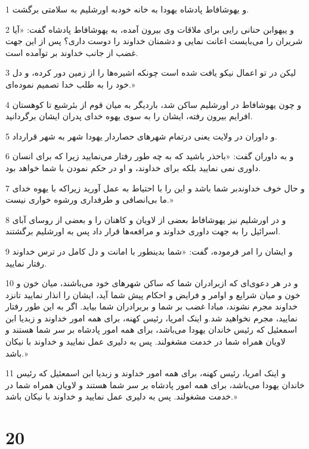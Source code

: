 \par 1 و یهوشافاط پادشاه یهودا به خانه خودبه اورشلیم به سلامتی برگشت.
\par 2 و ییهوابن حنانی رایی برای ملاقات وی بیرون آمده، به یهوشافاط پادشاه گفت: «آیا شریران را می‌بایست اعانت نمایی و دشمنان خداوند را دوست داری؟ پس از این جهت غضب از جانب خداوند بر توآمده است.
\par 3 لیکن در تو اعمال نیکو یافت شده است چونکه اشیره‌ها را از زمین دور کرده، و دل خود را به طلب خدا تصمیم نموده‌ای.»
\par 4 و چون یهوشافاط در اورشلیم ساکن شد، باردیگر به میان قوم از بئرشبع تا کوهستان افرایم بیرون رفته، ایشان را به سوی یهوه خدای پدران ایشان برگردانید.
\par 5 و داوران در ولایت یعنی درتمام شهرهای حصاردار یهودا شهر به شهر قرارداد.
\par 6 و به داوران گفت: «باحذر باشید که به چه طور رفتار می‌نمایید زیرا که برای انسان داوری نمی نمایید بلکه برای خداوند، و او در حکم نمودن با شما خواهد بود.
\par 7 و حال خوف خداوندبر شما باشد و این را با احتیاط به عمل آورید زیراکه با یهوه خدای ما بی‌انصافی و طرفداری ورشوه خواری نیست.»
\par 8 و در اورشلیم نیز یهوشافاط بعضی از لاویان و کاهنان را و بعضی از روسای آبای اسرائیل را به جهت داوری خداوند و مرافعه‌ها قرار داد پس به اورشلیم برگشتند.
\par 9 و ایشان را امر فرموده، گفت: «شما بدینطور با امانت و دل کامل در ترس خداوند رفتار نمایید.
\par 10 و در هر دعوی‌ای که ازبرادران شما که ساکن شهرهای خود می‌باشند، میان خون و خون و میان شرایع و اوامر و فرایض و احکام پیش شما آید، ایشان را انذار نمایید تانزد خداوند مجرم نشوند، مبادا غضب بر شما و بربرادران شما بیاید. اگر به این طور رفتار نمایید، مجرم نخواهید شد.و اینک امریا، رئیس کهنه، برای همه امور خداوند و زبدیا ابن اسمعئیل که رئیس خاندان یهودا می‌باشد، برای همه امور پادشاه بر سر شما هستند و لاویان همراه شما در خدمت مشغولند. پس به دلیری عمل نمایید و خداوند با نیکان باشد.»
\par 11 و اینک امریا، رئیس کهنه، برای همه امور خداوند و زبدیا ابن اسمعئیل که رئیس خاندان یهودا می‌باشد، برای همه امور پادشاه بر سر شما هستند و لاویان همراه شما در خدمت مشغولند. پس به دلیری عمل نمایید و خداوند با نیکان باشد.»
 
\chapter{20}

